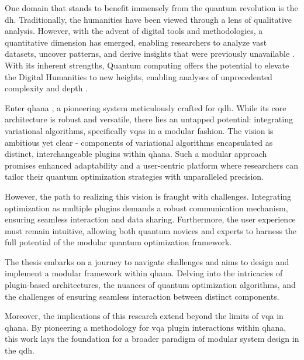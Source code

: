 \documentclass[
  a4paper,  %
  twoside,  %
  bibliography=totoc,
  headsepline,
  cleardoublepage=empty,
  parskip=half,
  draft=false
]{scrbook}
\begin{document}
One domain that stands to benefit immensely from the quantum revolution is the \gls{dh}.
Traditionally, the humanities have been viewed through a lens of qualitative analysis.
However, with the advent of digital tools and methodologies, a quantitative dimension has emerged, enabling researchers to analyze vast datasets, uncover patterns, and derive insights that were previously unavailable \cite{Barzen2019}.
With its inherent strengths, Quantum computing offers the potential to elevate the Digital Humanities to new heights, enabling analyses of unprecedented complexity and depth \cite{Barzen2022}.

Enter \gls{qhana} \cite{Buehler2022}, a pioneering system meticulously crafted for \gls{qdh}.
While its core architecture is robust and versatile, there lies an untapped potential: integrating variational algorithms, specifically \glspl{vqa} in a modular fashion.
The vision is ambitious yet clear - components of variational algorithms encapsulated as distinct, interchangeable plugins within \gls{qhana}.
Such a modular approach promises enhanced adaptability and a user-centric platform where researchers can tailor their quantum optimization strategies with unparalleled precision.

However, the path to realizing this vision is fraught with challenges.
Integrating optimization as multiple plugins demands a robust communication mechanism, ensuring seamless interaction and data sharing.
Furthermore, the user experience must remain intuitive, allowing both quantum novices and experts to harness the full potential of the modular quantum optimization framework.

The thesis embarks on a journey to navigate challenges and aims to design and implement a modular framework within \gls{qhana}. Delving into the intricacies of plugin-based architectures, the nuances of quantum optimization algorithms, and the challenges of ensuring seamless interaction between distinct components.

Moreover, the implications of this research extend beyond the limits of \gls{vqa} in \gls{qhana}.
By pioneering a methodology for \gls{vqa} plugin interactions within \gls{qhana}, this work lays the foundation for a broader paradigm of modular system design in the \gls{qdh}.
\end{document}
